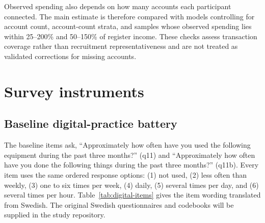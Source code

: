 \documentclass[11pt,a4paper]{article}
\begin{document}
Observed spending also depends on how many accounts each participant connected.
The main estimate is therefore compared with models controlling for account
count, account-count strata, and samples whose observed spending lies within
25--200\% and 50--150\% of register income. These checks assess transaction
coverage rather than recruitment representativeness and are not treated as
validated corrections for missing accounts.

\section{Survey instruments}

\subsection{Baseline digital-practice battery}
The baseline items ask, ``Approximately how often have you used the following
equipment during the past three months?'' (q11) and ``Approximately how often
have you done the following things during the past three months?'' (q11b).
Every item uses the same ordered response options: (1) not used, (2) less often
than weekly, (3) one to six times per week, (4) daily, (5) several times per
day, and (6) several times per hour. Table~\ref{tab:digital-items} gives the
item wording translated from Swedish. The original Swedish questionnaires and
codebooks will be supplied in the study repository.
\end{document}
